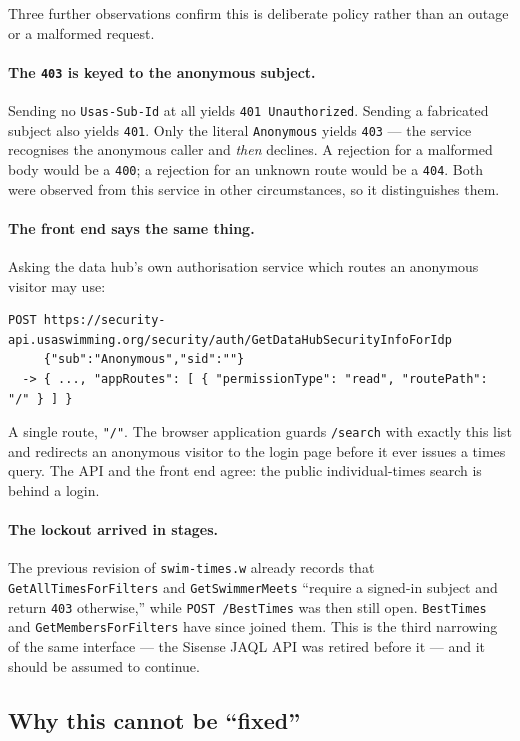 \documentclass[11pt]{article}
\newcommand{\code}[1]{\texttt{#1}}
\begin{document}
Three further observations confirm this is deliberate policy rather
than an outage or a malformed request.

\paragraph{The \code{403} is keyed to the anonymous subject.}
Sending no \code{Usas-Sub-Id} at all yields \code{401 Unauthorized}.
Sending a fabricated subject also yields \code{401}.  Only the literal
\code{Anonymous} yields \code{403} --- the service recognises the
anonymous caller and \emph{then} declines.  A rejection for a malformed
body would be a \code{400}; a rejection for an unknown route would be a
\code{404}.  Both were observed from this service in other
circumstances, so it distinguishes them.

\paragraph{The front end says the same thing.}  Asking the data hub's
own authorisation service which routes an anonymous visitor may use:

\begin{lstlisting}
POST https://security-api.usaswimming.org/security/auth/GetDataHubSecurityInfoForIdp
     {"sub":"Anonymous","sid":""}
  -> { ..., "appRoutes": [ { "permissionType": "read", "routePath": "/" } ] }
\end{lstlisting}

\noindent A single route, \code{"/"}.  The browser application guards
\code{/search} with exactly this list and redirects an anonymous
visitor to the login page before it ever issues a times query.  The
API and the front end agree: the public individual-times search is
behind a login.

\paragraph{The lockout arrived in stages.}  The previous revision of
\code{swim-times.w} already records that
\code{GetAllTimesForFilters} and \code{GetSwimmerMeets} ``require a
signed-in subject and return \code{403} otherwise,'' while
\code{POST /BestTimes} was then still open.  \code{BestTimes} and
\code{GetMembersForFilters} have since joined them.  This is the third
narrowing of the same interface --- the Sisense JAQL API was retired
before it --- and it should be assumed to continue.

\subsection{Why this cannot be ``fixed''}
\end{document}
